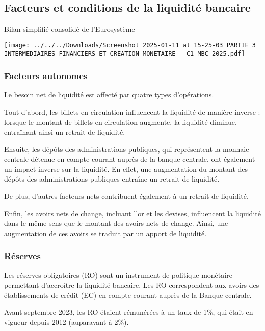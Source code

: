 \documentclass[a4paper, 12pt]{report}
\begin{document}
\subsection{Facteurs et conditions de la liquidité bancaire}

Bilan simplifié consolidé de l'Eurosystème

\begin{center}
	\texttt{[image: ../../../Downloads/Screenshot 2025-01-11 at 15-25-03 PARTIE 3 INTERMEDIAIRES FINANCIERS ET CREATION MONETAIRE - C1 MBC 2025.pdf]}
\end{center}

\subsubsection{Facteurs autonomes}

Le besoin net de liquidité est affecté par quatre types d'opérations. 

Tout d'abord, les billets en circulation influencent la liquidité de manière inverse : lorsque le montant de billets en circulation augmente, la liquidité diminue, entraînant ainsi un retrait de liquidité. 

Ensuite, les dépôts des administrations publiques, qui représentent la monnaie centrale détenue en compte courant auprès de la banque centrale, ont également un impact inverse sur la liquidité. En effet, une augmentation du montant des dépôts des administrations publiques entraîne un retrait de liquidité.

De plus, d'autres facteurs nets contribuent également à un retrait de liquidité. 

Enfin, les avoirs nets de change, incluant l'or et les devises, influencent la liquidité dans le même sens que le montant des avoirs nets de change. Ainsi, une augmentation de ces avoirs se traduit par un apport de liquidité.

\subsubsection{Réserves}

Les réserves obligatoires (RO) sont un instrument de politique monétaire permettant d'accroître la liquidité bancaire. Les RO correspondent aux avoirs des établissements de crédit (EC) en compte courant auprès de la Banque centrale.

Avant septembre 2023, les RO étaient rémunérées à un taux de 1\%, qui était en vigueur depuis 2012 (auparavant à 2\%).
\end{document}
